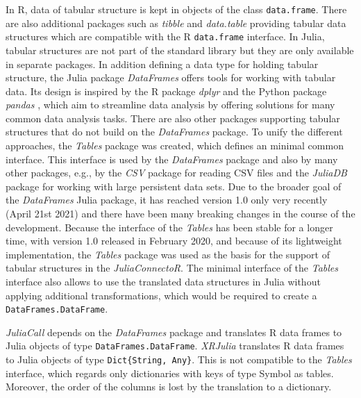\documentclass[12pt]{article}
\newcommand{\inlinecode}[1]{\texttt{#1}}
\newcommand{\apkg}[1]{\emph{#1}}
\begin{document}
In R, data of tabular structure is kept in objects of the class \inlinecode{data.frame}.
There are also additional packages such as \apkg{tibble} \citep{tibble} and \apkg{data.table} \citep{datatable} providing tabular data structures which are compatible with the R \inlinecode{data.frame} interface.
In Julia, tabular structures are not part of the standard library but they are only available in separate packages.
In addition defining a data type for holding tabular structure, the Julia package \apkg{DataFrames} \citep{juliaDataFramesGithub} offers tools for working with tabular data.
Its design is inspired by the R package \apkg{dplyr} \citep{dplyr} and the Python package \apkg{pandas} \citep{pandas}, which aim to streamline data analysis by offering solutions for many common data analysis tasks.
There are also other packages supporting tabular structures that do not build on the \apkg{DataFrames} package.
To unify the different approaches, the \apkg{Tables} package was created, which defines an minimal common interface.
This interface is used by the \apkg{DataFrames} package and also by many other packages, e.g., by the \apkg{CSV} \citep{juliacsvGithub} package for reading CSV files and the \apkg{JuliaDB} package \citep{juliadbGithub} for working with large persistent data sets.
Due to the broader goal of the \apkg{DataFrames} Julia package, it has reached version 1.0 only very recently (April 21st 2021) and there have been many breaking changes in the course of the development.
Because the interface of the \apkg{Tables} has been stable for a longer time, with version 1.0 released in February 2020, and because of its lightweight implementation, the \apkg{Tables} package was used as the basis for the support of tabular structures in the \apkg{JuliaConnectoR}.
The minimal interface of the \apkg{Tables} interface also allows to use the translated data structures in Julia without applying additional transformations, which would be required to create a \inlinecode{DataFrames.DataFrame}.

\apkg{JuliaCall} depends on the \apkg{DataFrames} package and translates R data frames to Julia objects of type \inlinecode{DataFrames.DataFrame}.
\apkg{XRJulia} translates R data frames to Julia objects of type \inlinecode{Dict\{String, Any\}}.
This is not compatible to the \apkg{Tables} interface, which regards only dictionaries with keys of type {Symbol} as tables.
Moreover, the order of the columns is lost by the translation to a dictionary.
\end{document}
